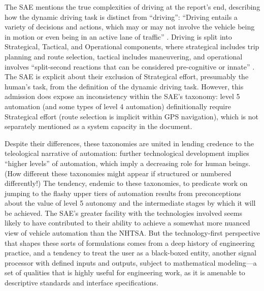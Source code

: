 The SAE mentions the true complexities of driving at the report's end,
describing how the dynamic driving task is distinct from ``driving'':
``Driving entails a variety of decisions and actions, which may or may
not involve the vehicle being in motion or even being in an active
lane of traffic'' \cite[p. 12]{SAE}. Driving is split into Strategical, Tactical, and
Operational components, where strategical includes trip planning and
route selection, tactical includes maneuvering, and operational
involves ``split-second reactions that can be considered pre-cognitive
or innate'' \cite{Michon}. The SAE is explicit about their exclusion of Strategical
effort, presumably the human's task, from the definition of the
dynamic driving task. However, this admission does expose an
inconsistency within the SAE's taxonomy: level 5 automation (and some
types of level 4 automation) definitionally require Strategical effort
(route selection is implicit within GPS navigation), which is not
separately mentioned as a system capacity in the document.


Despite their differences, these taxonomies are united in lending
credence to the teleological narrative of automation:  further
technological development implies ``higher levels'' of automation, which
imply a decreasing role for human beings. (How different these
taxonomies might appear if structured or numbered differently!)
The tendency, endemic to these taxonomies, to predicate work on
jumping to the flashy upper tiers of automation results from
preconceptions about the value of level 5 autonomy and the
intermediate stages by which it will be achieved. The SAE's 
greater facility with the technologies involved seems likely to have
contributed to their ability to achieve a somewhat more nuanced view
of vehicle automation than the NHTSA. But the
technology-first perspective that shapes these sorts of formulations
comes from a deep history of engineering practice, and a 
tendency to treat the user as a black-boxed entity, another signal
processor with defined inputs and outputs, subject to mathematical
modeling---a set of qualities that is highly useful for engineering
work, as it is amenable to descriptive standards and interface
specifications. 


